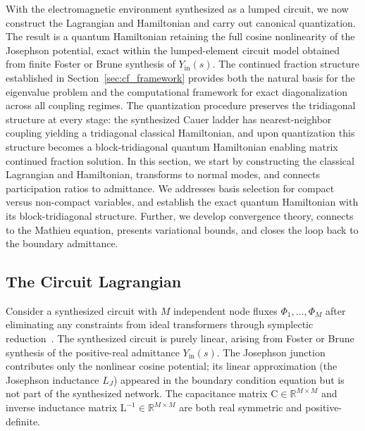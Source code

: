 \documentclass[reprint, floatfix, superscriptaddress, amsmath, amssymb, longbibliography]{revtex4-2}
\newcommand{\Yin}{Y_{\mathrm{in}}}
\begin{document}
With the electromagnetic environment synthesized as a lumped circuit, we now construct the Lagrangian and Hamiltonian and carry out canonical quantization. The result is a quantum Hamiltonian retaining the full cosine nonlinearity of the Josephson potential, exact within the lumped-element circuit model obtained from finite Foster or Brune synthesis of $\Yin(s)$. The continued fraction structure established in Section~\ref{sec:cf_framework} provides both the natural basis for the eigenvalue problem and the computational framework for exact diagonalization across all coupling regimes. The quantization procedure preserves the tridiagonal structure at every stage: the synthesized Cauer ladder has nearest-neighbor coupling yielding a tridiagonal classical Hamiltonian, and upon quantization this structure becomes a block-tridiagonal quantum Hamiltonian enabling matrix continued fraction solution. In this section, we start by constructing the classical Lagrangian and Hamiltonian, transforms to normal modes, and connects participation ratios to admittance. We addresses basis selection for compact versus non-compact variables, and establish the exact quantum Hamiltonian with its block-tridiagonal structure. Further, we develop convergence theory, connects to the Mathieu equation, presents variational bounds, and closes the loop back to the boundary admittance.

\subsection{The Circuit Lagrangian}
\label{sec:lagrangian}

Consider a synthesized circuit with $M$ independent node fluxes $\Phi_1, \ldots, \Phi_M$ after eliminating any constraints from ideal transformers through symplectic reduction~\cite{Osborne2024}. The synthesized circuit is purely linear, arising from Foster or Brune synthesis of the positive-real admittance $\Yin(s)$. The Josephson junction contributes only the nonlinear cosine potential; its linear approximation (the Josephson inductance $L_J$) appeared in the boundary condition equation but is not part of the synthesized network. The capacitance matrix $\mathrm{C} \in \mathbb{R}^{M \times M}$ and inverse inductance matrix $\mathrm{L}^{-1} \in \mathbb{R}^{M \times M}$ are both real symmetric and positive-definite.
\end{document}
